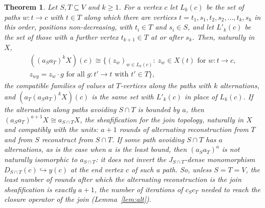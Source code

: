 \documentclass[11pt]{amsart}
\newtheorem{thm}{Theorem}[section]
\theoremstyle{definition}
\begin{document}
\begin{thm}\label{thm:iter}
Let $S,T\subseteq V$ and $k\ge1$. For a vertex $c$ let $L_k(c)$ be the
set of paths $w\colon t\to c$ with $t\in T$ along which there are
vertices $t=t_1,s_1,t_2,s_2,\dots,t_k,s_k$ in this order, positions
non-decreasing, with $t_i\in T$ and $s_i\in S$, and let $L'_k(c)$ be the
set of those with a further vertex $t_{k+1}\in T$ at or after $s_k$.
Then, naturally in $X$,
\begin{multline*}
((a_Sa_T)^kX)(c)\cong\{(z_w)_{w\in L_k(c)}:\ z_w\in X(t)\text{ for }
w\colon t\to c,\\
z_{wg}=z_w\cdot g\text{ for all }g\colon t'\to t\text{ with }t'\in T\},
\end{multline*}
the compatible families of values at $T$-vertices along the paths with
$k$ alternations, and $(a_T(a_Sa_T)^kX)(c)$ is the same set with
$L'_k(c)$ in place of $L_k(c)$. If the alternation along paths avoiding
$S\cap T$ is bounded by $a$, then $(a_Sa_T)^{a+1}X\cong a_{S\cap T}X$,
the sheafification for the join topology, naturally in $X$ and
compatibly with the units: $a+1$ rounds of alternating reconstruction
from $T$ and from $S$ reconstruct from $S\cap T$. If some path avoiding
$S\cap T$ has $a$ alternations, as is the case when $a$ is the least
bound, then $(a_Sa_T)^a$ is not naturally isomorphic to $a_{S\cap T}$:
it does not invert the $J_{S\cap T}$-dense monomorphism $D_{S\cap
T}(c)\hookrightarrow y(c)$ at the end vertex $c$ of such a path. So,
unless $S=T=V$, the least number of rounds after which the alternating
reconstruction is the join sheafification is exactly $a+1$, the number
of iterations of $c_Sc_T$ needed to reach the closure operator of the
join (Lemma~\ref{lem:alt}).
\end{thm}
\end{document}
